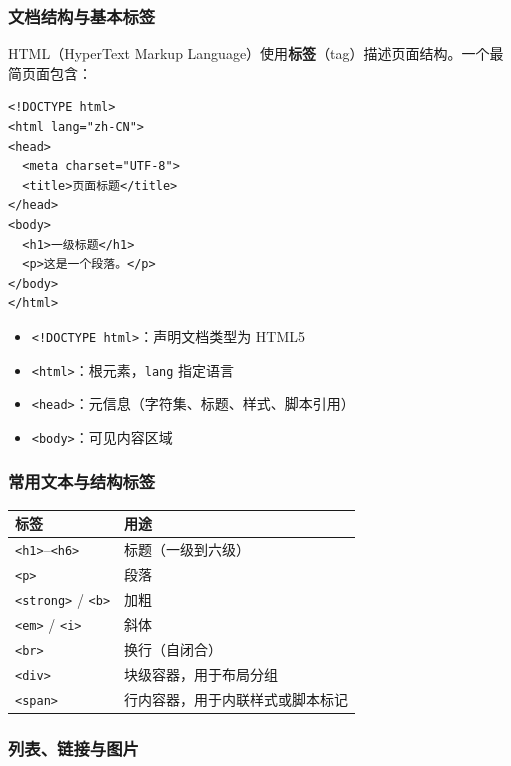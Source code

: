 \documentclass[11pt]{article}
\begin{document}
\subsubsection{文档结构与基本标签}

HTML（HyperText Markup Language）使用\textbf{标签}（tag）描述页面结构。一个最简页面包含：

\begin{lstlisting}[caption=HTML 文档基本结构]
<!DOCTYPE html>
<html lang="zh-CN">
<head>
  <meta charset="UTF-8">
  <title>页面标题</title>
</head>
<body>
  <h1>一级标题</h1>
  <p>这是一个段落。</p>
</body>
</html>
\end{lstlisting}

\begin{itemize}
    \item \texttt{<!DOCTYPE html>}：声明文档类型为 HTML5
    \item \texttt{<html>}：根元素，\texttt{lang} 指定语言
    \item \texttt{<head>}：元信息（字符集、标题、样式、脚本引用）
    \item \texttt{<body>}：可见内容区域
\end{itemize}

\subsubsection{常用文本与结构标签}

\begin{center}
\begin{tabular}{|l|l|}
\hline
\textbf{标签} & \textbf{用途} \\
\hline
\texttt{<h1>}--\texttt{<h6>} & 标题（一级到六级） \\
\texttt{<p>} & 段落 \\
\texttt{<strong>} / \texttt{<b>} & 加粗 \\
\texttt{<em>} / \texttt{<i>} & 斜体 \\
\texttt{<br>} & 换行（自闭合） \\
\texttt{<div>} & 块级容器，用于布局分组 \\
\texttt{<span>} & 行内容器，用于内联样式或脚本标记 \\
\hline
\end{tabular}
\end{center}

\subsubsection{列表、链接与图片}
\end{document}
